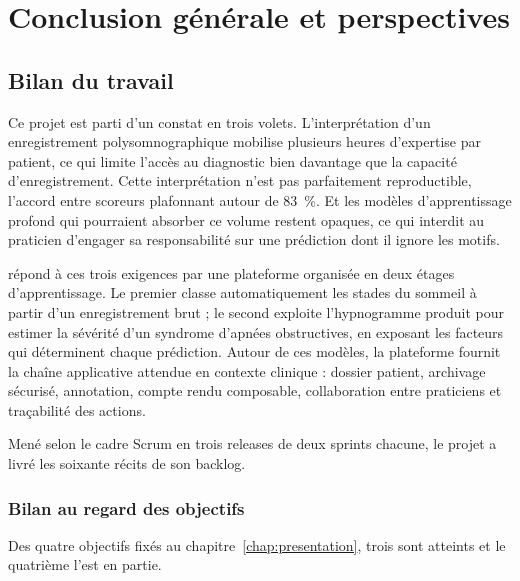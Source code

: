 \chapter*{Conclusion générale et perspectives}

\section*{Bilan du travail}

Ce projet est parti d'un constat en trois volets. L'interprétation d'un enregistrement
polysomnographique mobilise plusieurs heures d'expertise par patient, ce qui limite
l'accès au diagnostic bien davantage que la capacité d'enregistrement. Cette
interprétation n'est pas parfaitement reproductible, l'accord entre scoreurs
plafonnant autour de \SI{83}{\percent}. Et les modèles d'apprentissage profond qui
pourraient absorber ce volume restent opaques, ce qui interdit au praticien d'engager
sa responsabilité sur une prédiction dont il ignore les motifs.

\hypnoria{} répond à ces trois exigences par une plateforme organisée en deux étages
d'apprentissage. Le premier classe automatiquement les stades du sommeil à partir d'un
enregistrement brut ; le second exploite l'hypnogramme produit pour estimer la sévérité
d'un syndrome d'apnées obstructives, en exposant les facteurs qui déterminent chaque
prédiction. Autour de ces modèles, la plateforme fournit la chaîne applicative attendue
en contexte clinique : dossier patient, archivage sécurisé, annotation, compte rendu
composable, collaboration entre praticiens et traçabilité des actions.

Mené selon le cadre Scrum en trois releases de deux sprints chacune, le projet a livré les
soixante récits de son backlog.

\subsection*{Bilan au regard des objectifs}

Des quatre objectifs fixés au chapitre~\ref{chap:presentation}, trois sont atteints et
le quatrième l'est en partie.

